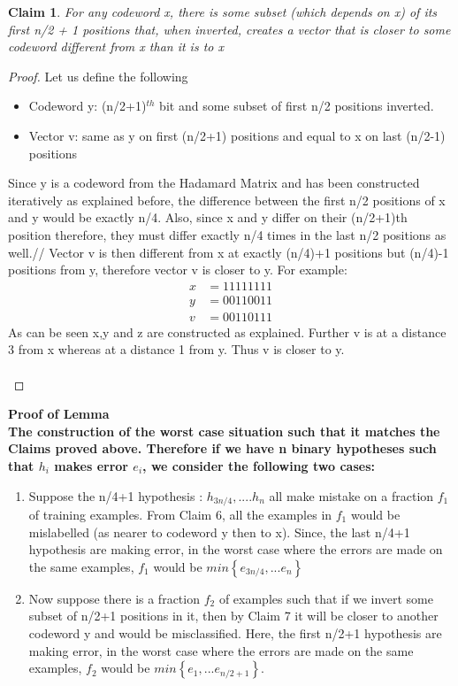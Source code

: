 \documentclass[11pt]{article}
\newtheorem{claim}[theorem]{Claim}
\begin{document}
            \begin{claim} 
                    For any codeword x, there is some subset (which depends on x) of its first n/2 + 1 positions that, when inverted, creates a vector that is closer to some codeword different from x than it is to x
            \end{claim}
            \begin{proof}
                Let us define the following
                \begin{itemize}
                    \item Codeword y: (n/2+1)$^{th}$ bit and some subset of first n/2 positions inverted.
                    \item Vector v: same as y on first (n/2+1) positions and equal to x on last (n/2-1) positions
                \end{itemize}
                 Since y is a codeword from the Hadamard Matrix and has been constructed iteratively as explained before, the difference between the first n/2 positions of x and y would be exactly n/4. Also, since x and y differ on their (n/2+1)th position therefore, they must differ exactly n/4 times in the last n/2 positions as well.//
                 Vector v is then different from x at exactly (n/4)+1 positions but (n/4)-1 positions from y, therefore vector v is closer to y. For example:
                 \begin{align*}
                      x & =11111111\\
                      y & =00110011\\
                      v & =00110111 
                 \end{align*}
                 As can be seen x,y and z are constructed as explained. Further v is at a distance 3 from x whereas at a distance 1 from y. Thus v is closer to y.\\\\
            \end{proof}
    \bf Proof of Lemma \normalfont\\
    The construction of the worst case situation such that it matches the Claims proved above. Therefore if we have n binary hypotheses such that $h_i$ makes error $e_i$, we consider the following two cases:
    \begin{enumerate}
        \item Suppose the n/4+1 hypothesis : $h_{3n/4},....h_{n}$ all make mistake on a fraction $f_1$ of training examples. From Claim 6, all the examples in $f_1$ would be mislabelled (as nearer to codeword y then to x).
        Since, the last n/4+1 hypothesis are making error, in the worst case where the errors are made on the same examples, $f_1$ would be $min\left\{e_{3n/4},...e_n\right\}$
        \item Now suppose there is a fraction $f_2$ of examples such that if we invert some subset of n/2+1 positions in it, then by Claim 7 it will be closer to another codeword y and would be misclassified. Here, the first n/2+1 hypothesis are making error, in the worst case where the errors are made on the same examples, $f_2$ would be $min\left\{e_{1},...e_{n/2+1}\right\}$.
    \end{enumerate}
\end{document}
